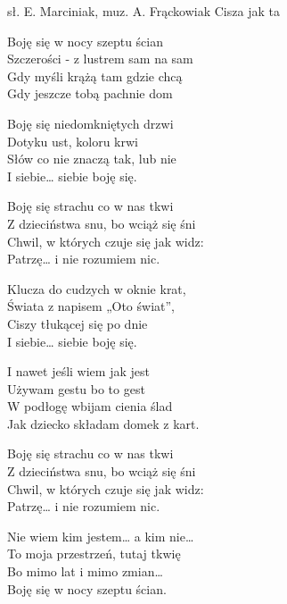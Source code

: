 {sł. E. Marciniak, muz. A. Frąckowiak}
{Cisza jak ta}
\begin{text}
Boję się w nocy szeptu ścian\\
Szczerości - z lustrem sam na sam\\
Gdy myśli krążą tam gdzie chcą\\
Gdy jeszcze tobą pachnie dom

Boję się niedomkniętych drzwi\\
Dotyku ust, koloru krwi\\
Słów co nie znaczą tak, lub nie\\
I siebie… siebie boję się.

Boję się strachu co w nas tkwi\\
Z dzieciństwa snu, bo wciąż się śni\\
Chwil, w których czuje się jak widz:\\
Patrzę… i nie rozumiem nic.

Klucza do cudzych w oknie krat,\\
Świata z napisem „Oto świat”,\\
Ciszy tłukącej się po dnie\\
I siebie… siebie boję się.

I nawet jeśli wiem jak jest\\
Używam gestu bo to gest\\
W podłogę wbijam cienia ślad\\
Jak dziecko składam domek z kart.

Boję się strachu co w nas tkwi\\
Z dzieciństwa snu, bo wciąż się śni\\
Chwil, w których czuje się jak widz:\\
Patrzę… i nie rozumiem nic.

Nie wiem kim jestem… a kim nie…\\
To moja przestrzeń, tutaj tkwię\\
Bo mimo lat i mimo zmian…\\
Boję się w nocy szeptu ścian.
\end{text}
\begin{chord}
\end{chord}
